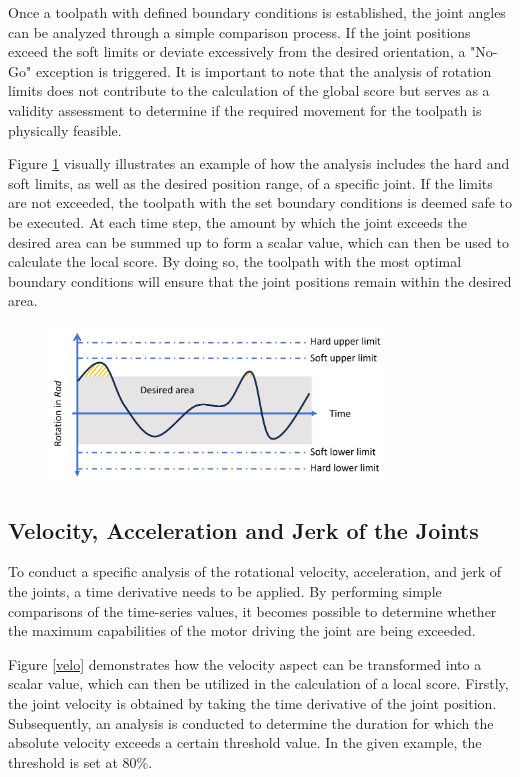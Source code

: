 Once a toolpath with defined boundary conditions is established, the joint angles can be analyzed through a simple comparison process. If the joint positions exceed the soft limits or deviate excessively from the desired orientation, a "No-Go" exception is triggered. It is important to note that the analysis of rotation limits does not contribute to the calculation of the global score but serves as a validity assessment to determine if the required movement for the toolpath is physically feasible.

Figure \ref{limits} visually illustrates an example of how the analysis includes the hard and soft limits, as well as the desired position range, of a specific joint. If the limits are not exceeded, the toolpath with the set boundary conditions is deemed safe to be executed. At each time step, the amount by which the joint exceeds the desired area can be summed up to form a scalar value, which can then be used to calculate the local score. By doing so, the toolpath with the most optimal boundary conditions will ensure that the joint positions remain within the desired area.

\begin{figure}[H]
	\centerline{\includegraphics[width=0.8\textwidth]{figures/limits.png}}
	\caption{}
	\label{limits}
\end{figure}

\subsection{Velocity, Acceleration and Jerk of the Joints}\label{VAJJ}
To conduct a specific analysis of the rotational velocity, acceleration, and jerk of the joints, a time derivative needs to be applied. By performing simple comparisons of the time-series values, it becomes possible to determine whether the maximum capabilities of the motor driving the joint are being exceeded.

Figure \ref{velo} demonstrates how the velocity aspect can be transformed into a scalar value, which can then be utilized in the calculation of a local score. Firstly, the joint velocity is obtained by taking the time derivative of the joint position. Subsequently, an analysis is conducted to determine the duration for which the absolute velocity exceeds a certain threshold value. In the given example, the threshold is set at 80\%. 

